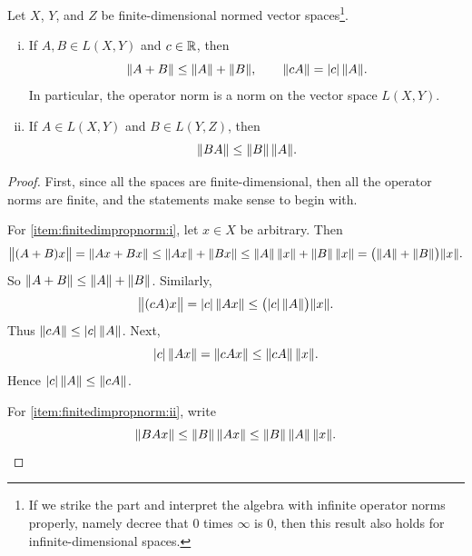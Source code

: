 \begin{prop} \label{prop:finitedimpropnorm}
\pagebreak[3]
Let $X$, $Y$, and $Z$ be finite-dimensional normed vector
spaces\footnote{If we strike the  part and interpret the
algebra with infinite operator norms properly, namely decree that $0$ times
$\infty$ is 0, then this result also holds for infinite-dimensional spaces.}.
\begin{enumerate}[(i)]
\item \label{item:finitedimpropnorm:i}
If $A,B \in L(X,Y)$ and $c \in {\mathbb{R}}$, then
\begin{equation*}
\lVert {A+B} \rVert \leq \lVert {A} \rVert+\lVert {B} \rVert, \qquad \lVert {cA} \rVert = \lvert {c} \rvert \, \lVert {A} \rVert .
\end{equation*}
In particular, the operator norm is a norm on the vector space $L(X,Y)$.
\item \label{item:finitedimpropnorm:ii}
If $A \in L(X,Y)$ and $B \in L(Y,Z)$, then
\begin{equation*}
\lVert {BA} \rVert \leq \lVert {B} \rVert \, \lVert {A} \rVert .
\end{equation*}
\end{enumerate}
\end{prop}

\begin{proof}
First, since all the spaces are finite-dimensional, then all the operator
norms are finite, and the statements make sense to begin with.

For \ref{item:finitedimpropnorm:i}, let $x \in X$ be arbitrary.  Then
\begin{equation*}
\bigl\lVert {(A+B)x} \bigr\rVert =
\lVert {Ax+Bx} \rVert \leq
\lVert {Ax} \rVert+\lVert {Bx} \rVert \leq
\lVert {A} \rVert \, \lVert {x} \rVert+\lVert {B} \rVert \,\lVert {x} \rVert =
\bigl(\lVert {A} \rVert+\lVert {B} \rVert\bigr) \lVert {x} \rVert .
\end{equation*}
So $\lVert {A+B} \rVert \leq \lVert {A} \rVert+\lVert {B} \rVert$.
Similarly,
\begin{equation*}
\bigl\lVert {(cA)x} \bigr\rVert =
\lvert {c} \rvert \, \lVert {Ax} \rVert \leq \bigl(\lvert {c} \rvert \,\lVert {A} \rVert\bigr) \lVert {x} \rVert .
\end{equation*}
Thus $\lVert {cA} \rVert \leq \lvert {c} \rvert \, \lVert {A} \rVert$.  Next,
\begin{equation*}
\lvert {c} \rvert \,  \lVert {Ax} \rVert
=
\lVert {cAx} \rVert \leq \lVert {cA} \rVert \, \lVert {x} \rVert .
\end{equation*}
Hence $\lvert {c} \rvert \, \lVert {A} \rVert \leq \lVert {cA} \rVert$.


For \ref{item:finitedimpropnorm:ii}, write
\begin{equation*}
\lVert {BAx} \rVert \leq \lVert {B} \rVert \, \lVert {Ax} \rVert \leq \lVert {B} \rVert \, \lVert {A} \rVert \, \lVert {x} \rVert .
\qedhere
\end{equation*}
\end{proof}

